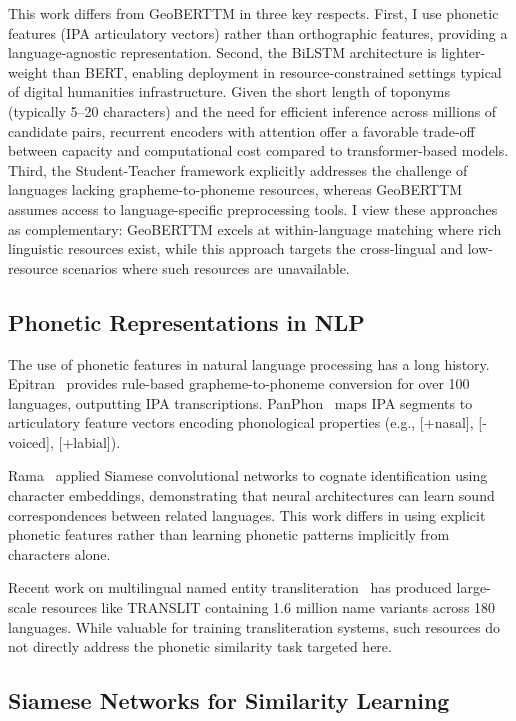 \documentclass[11pt]{article}
\begin{document}
    This work differs from GeoBERTTM in three key respects. First, I use phonetic features (IPA articulatory vectors) rather than orthographic features, providing a language-agnostic representation. Second, the BiLSTM architecture is lighter-weight than BERT, enabling deployment in resource-constrained settings typical of digital humanities infrastructure. Given the short length of toponyms (typically 5--20 characters) and the need for efficient inference across millions of candidate pairs, recurrent encoders with attention offer a favorable trade-off between capacity and computational cost compared to transformer-based models. Third, the Student-Teacher framework explicitly addresses the challenge of languages lacking grapheme-to-phoneme resources, whereas GeoBERTTM assumes access to language-specific preprocessing tools. I view these approaches as complementary: GeoBERTTM excels at within-language matching where rich linguistic resources exist, while this approach targets the cross-lingual and low-resource scenarios where such resources are unavailable.

    \subsection{Phonetic Representations in NLP}

    The use of phonetic features in natural language processing has a long history. Epitran~\citep{mortensen2018} provides rule-based grapheme-to-phoneme conversion for over 100 languages, outputting IPA transcriptions. PanPhon~\citep{mortensen2016} maps IPA segments to articulatory feature vectors encoding phonological properties (e.g., [+nasal], [-voiced], [+labial]).

    Rama~\citep{rama2016} applied Siamese convolutional networks to cognate identification using character embeddings, demonstrating that neural architectures can learn sound correspondences between related languages. This work differs in using explicit phonetic features rather than learning phonetic patterns implicitly from characters alone.

    Recent work on multilingual named entity transliteration~\citep{translit2020} has produced large-scale resources like TRANSLIT containing 1.6 million name variants across 180 languages. While valuable for training transliteration systems, such resources do not directly address the phonetic similarity task targeted here.

    \subsection{Siamese Networks for Similarity Learning}
\end{document}
